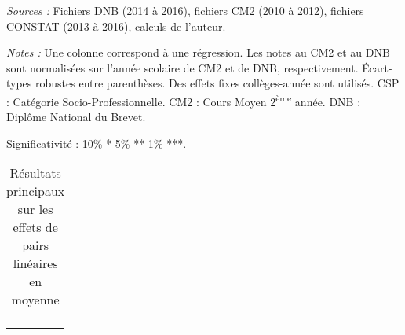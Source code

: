 \documentclass[
]{book}
\begin{document}
\begin{landscape}\begingroup\fontsize{8}{10}\selectfont

\begin{ThreePartTable}
\begin{TableNotes}
\item \textit{Sources :} Fichiers DNB (2014 à 2016), fichiers CM2 (2010 à 2012), fichiers CONSTAT (2013 à 2016), calculs de l'auteur.
\item \textit{Notes :} Une colonne correspond à une régression. Les notes au CM2 et au DNB sont normalisées sur l'année scolaire de CM2 et de DNB, respectivement. Écart-types robustes entre parenthèses. Des effets fixes collèges-année sont utilisés. CSP : Catégorie Socio-Professionnelle. CM2 : Cours Moyen 2\textsuperscript{ème} année. DNB : Diplôme National du Brevet.
\item Significativité : 10\% * 5\% ** 1\% ***.
\end{TableNotes}
\begin{longtable}[t]{llllllllll}
\caption{\label{tab:pemodels0}Résultats principaux sur les effets de pairs linéaires en moyenne}\\
\toprule
{} &  \\
\cmidrule(l{3pt}r{3pt}){2-10}
 &  &  &  \\
\cmidrule(l{3pt}r{3pt}){2-3} \cmidrule(l{3pt}r{3pt}){4-7} \cmidrule(l{3pt}r{3pt}){8-10}

\end{longtable}
\end{ThreePartTable}
\end{landscape}
\end{document}

